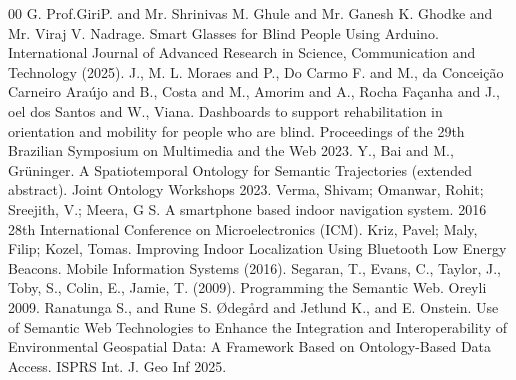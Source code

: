 \documentclass[conference]{IEEEtran}
\begin{document}
\begin{thebibliography}{00}
 G. Prof.GiriP. and Mr. Shrinivas M. Ghule and Mr. Ganesh K. Ghodke and Mr. Viraj V. Nadrage. Smart Glasses for Blind People Using Arduino. International Journal of Advanced Research in Science, Communication and Technology (2025).
 J., M. L. Moraes and P., Do Carmo F. and M., da Conceiç{\~a}o Carneiro Ara{\'u}jo and B., Costa and M., Amorim and A., Rocha Façanha and J., oel dos Santos and W., Viana. Dashboards to support rehabilitation in orientation and mobility for people who are blind. Proceedings of the 29th Brazilian Symposium on Multimedia and the Web 2023.
 Y., Bai and M., Gr{\"u}ninger. A Spatiotemporal Ontology for Semantic Trajectories (extended abstract). Joint Ontology Workshops 2023.
 Verma, Shivam; Omanwar, Rohit; Sreejith, V.; Meera, G S. A smartphone based indoor navigation system. 2016 28th International Conference on Microelectronics (ICM).
 Kriz, Pavel; Maly, Filip; Kozel, Tomas. Improving Indoor Localization Using Bluetooth Low Energy Beacons. Mobile Information Systems (2016).
 Segaran, T., Evans, C., Taylor, J., Toby, S., Colin, E., Jamie, T. (2009). Programming the Semantic Web. Oreyli 2009.
 Ranatunga S., and Rune S. {\O}deg{\aa}rd and Jetlund K., and E. Onstein. Use of Semantic Web Technologies to Enhance the Integration and Interoperability of Environmental Geospatial Data: A Framework Based on Ontology-Based Data Access. ISPRS Int. J. Geo Inf 2025.

\end{thebibliography}
\end{document}
